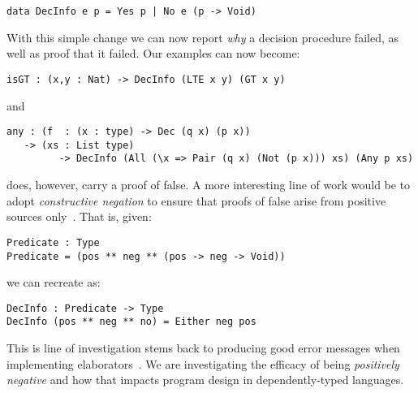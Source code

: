 \begin{verbatim}
data DecInfo e p = Yes p | No e (p -> Void)
\end{verbatim}

With this simple change we can now report \emph{why} a decision procedure failed, as well as proof that it failed.
Our examples can now become:

\begin{verbatim}
isGT : (x,y : Nat) -> DecInfo (LTE x y) (GT x y)
\end{verbatim}

\noindent
and

\begin{verbatim}
any : (f  : (x : type) -> Dec (q x) (p x))
   -> (xs : List type)
         -> DecInfo (All (\x => Pair (q x) (Not (p x))) xs) (Any p xs)
\end{verbatim}

 does, however, carry a proof of false.
A more interesting line of work would be to adopt \emph{constructive negation} to ensure that proofs of false arise from positive sources only~\cite{msfp/Atkey22}.
That is, given:

\begin{verbatim}
Predicate : Type
Predicate = (pos ** neg ** (pos -> neg -> Void))
\end{verbatim}

we can recreate  as:

\begin{verbatim}
DecInfo : Predicate -> Type
DecInfo (pos ** neg ** no) = Either neg pos
\end{verbatim}

This is line of investigation stems back to producing good error messages when implementing elaborators~\cite{DBLP:journals/jfp/McBrideM04}.
We are investigating the efficacy of being \emph{positively negative} and how that impacts program design in dependently-typed languages.

